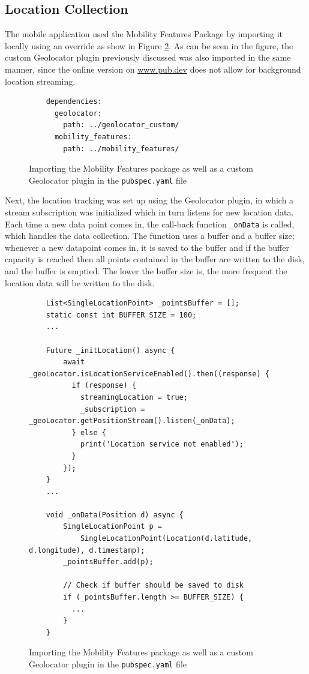 \subsection{Location Collection}
The mobile application used the Mobility Features Package by importing it locally using an override as show in Figure \ref{fig:import-package}. As can be seen in the figure, the custom Geolocator plugin previously discussed was also imported in the same manner, since the online version on \url{www.pub.dev} does not allow for background location streaming. 

\begin{figure}
    \centering
    \begin{verbatim}
    dependencies:
      geolocator:
        path: ../geolocator_custom/
      mobility_features:
        path: ../mobility_features/
    \end{verbatim}
    \caption{Importing the Mobility Features package as well as a custom Geolocator plugin in the \verb|pubspec.yaml| file}
    \label{fig:import-package}
\end{figure}

Next, the location tracking was set up using the Geolocator plugin, in which a stream subscription was initialized which in turn listens for new location data. Each time a new data point comes in, the call-back function \verb|_onData| is called, which handles the data collection. The function uses a buffer and a buffer size; whenever a new datapoint comes in, it is saved to the buffer and if the buffer capacity is reached then all points contained in the buffer are written to the disk, and the buffer is emptied. The lower the buffer size is, the more frequent the location data will be written to the disk.

\begin{figure}
    \centering
    \begin{verbatim}
    List<SingleLocationPoint> _pointsBuffer = [];
    static const int BUFFER_SIZE = 100;
    ...
    
    Future _initLocation() async {
        await _geoLocator.isLocationServiceEnabled().then((response) {
          if (response) {
            streamingLocation = true;
            _subscription = _geoLocator.getPositionStream().listen(_onData);
          } else {
            print('Location service not enabled');
          }
        });
    }
    ...
    
    void _onData(Position d) async {
        SingleLocationPoint p =
            SingleLocationPoint(Location(d.latitude, d.longitude), d.timestamp);
        _pointsBuffer.add(p);
    
        // Check if buffer should be saved to disk
        if (_pointsBuffer.length >= BUFFER_SIZE) {
          ...
        }
    }
    \end{verbatim}
    \caption{Importing the Mobility Features package as well as a custom Geolocator plugin in the \verb|pubspec.yaml| file}
    \label{fig:import-package}
\end{figure}



